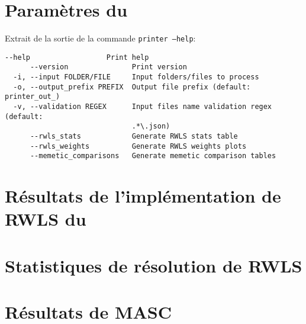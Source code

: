 \documentclass[a4paper,11pt,twoside,french,report]{../common/simplem}
\begin{document}
		\newpage\section{Paramètres du \printer{}}\label{sec:printer_parameters}
			Extrait de la sortie de la commande \texttt{printer --help}:
			\begin{Verbatim}[frame=single]
      --help                  Print help
      --version               Print version
  -i, --input FOLDER/FILE     Input folders/files to process
  -o, --output_prefix PREFIX  Output file prefix (default: printer_out_)
  -v, --validation REGEX      Input files name validation regex (default:
                              .*\.json)
      --rwls_stats            Generate RWLS stats table
      --rwls_weights          Generate RWLS weights plots
      --memetic_comparisons   Generate memetic comparison tables
			\end{Verbatim}
		\newpage\section{Résultats de l'implémentation de \acrshort{RWLS} du \solver{}}\label{sec:result_rwls_solver}
			
		\newpage\section{Statistiques de résolution de \acrshort{RWLS}}\label{sec:rwls_stats}
			
		\newpage\section{Résultats de \acrshort{MASC}}\label{sec:result_masc_solver}
			
	\makeutbmbackcover{}
\end{document}
